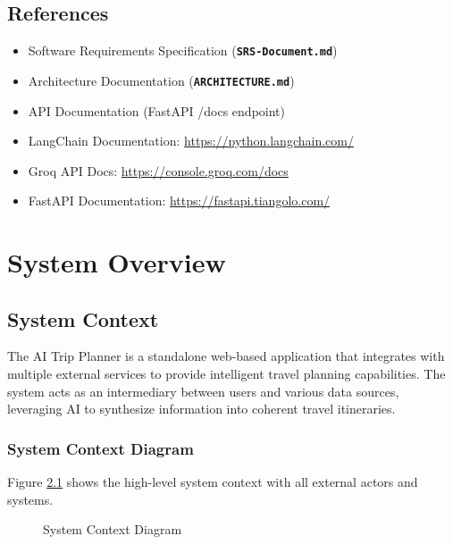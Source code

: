 \documentclass[12pt,a4paper]{report}
\newcommand{\file}[1]{\texttt{\textbf{#1}}}
\begin{document}
\section{References}

\begin{itemize}[leftmargin=*]
    \item Software Requirements Specification (\file{SRS-Document.md})
    \item Architecture Documentation (\file{ARCHITECTURE.md})
    \item API Documentation (FastAPI /docs endpoint)
    \item LangChain Documentation: \url{https://python.langchain.com/}
    \item Groq API Docs: \url{https://console.groq.com/docs}
    \item FastAPI Documentation: \url{https://fastapi.tiangolo.com/}
\end{itemize}


\chapter{System Overview}

\section{System Context}

The AI Trip Planner is a standalone web-based application that integrates with multiple external services to provide intelligent travel planning capabilities. The system acts as an intermediary between users and various data sources, leveraging AI to synthesize information into coherent travel itineraries.

\subsection{System Context Diagram}

Figure \ref{fig:system-context} shows the high-level system context with all external actors and systems.

\begin{figure}[H]
    \centering
    \caption{System Context Diagram}
    \label{fig:system-context}
\end{figure}
\end{document}
